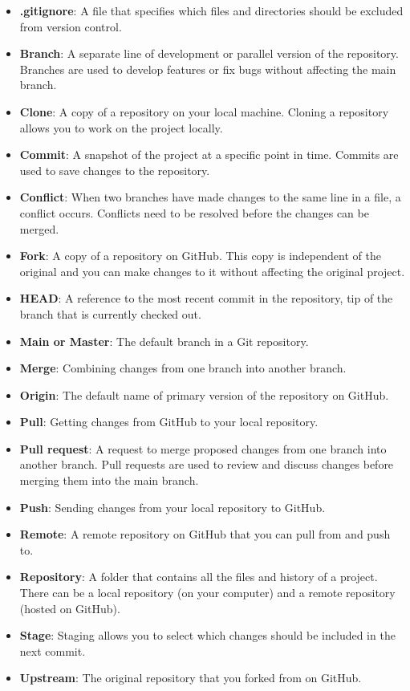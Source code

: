 \documentclass[
  letterpaper,
  DIV=11,
  numbers=noendperiod]{scrreport}
\begin{document}
\begin{itemize}
\item
  \textbf{.gitignore}: A file that specifies which files and directories
  should be excluded from version control.
\item
  \textbf{Branch}: A separate line of development or parallel version of
  the repository. Branches are used to develop features or fix bugs
  without affecting the main branch.
\item
  \textbf{Clone}: A copy of a repository on your local machine. Cloning
  a repository allows you to work on the project locally.
\item
  \textbf{Commit}: A snapshot of the project at a specific point in
  time. Commits are used to save changes to the repository.
\item
  \textbf{Conflict}: When two branches have made changes to the same
  line in a file, a conflict occurs. Conflicts need to be resolved
  before the changes can be merged.
\item
  \textbf{Fork}: A copy of a repository on GitHub. This copy is
  independent of the original and you can make changes to it without
  affecting the original project.
\item
  \textbf{HEAD}: A reference to the most recent commit in the
  repository, tip of the branch that is currently checked out.
\item
  \textbf{Main or Master}: The default branch in a Git repository.
\item
  \textbf{Merge}: Combining changes from one branch into another branch.
\item
  \textbf{Origin}: The default name of primary version of the repository
  on GitHub.
\item
  \textbf{Pull}: Getting changes from GitHub to your local repository.
\item
  \textbf{Pull request}: A request to merge proposed changes from one
  branch into another branch. Pull requests are used to review and
  discuss changes before merging them into the main branch.
\item
  \textbf{Push}: Sending changes from your local repository to GitHub.
\item
  \textbf{Remote}: A remote repository on GitHub that you can pull from
  and push to.
\item
  \textbf{Repository}: A folder that contains all the files and history
  of a project. There can be a local repository (on your computer) and a
  remote repository (hosted on GitHub).
\item
  \textbf{Stage}: Staging allows you to select which changes should be
  included in the next commit.
\item
  \textbf{Upstream}: The original repository that you forked from on
  GitHub.
\end{itemize}
\end{document}
